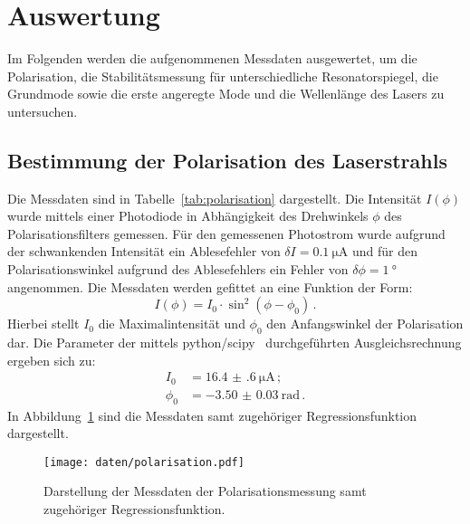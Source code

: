 \section{Auswertung}
\label{sec:Auswertung}
Im Folgenden werden die aufgenommenen Messdaten ausgewertet, um die Polarisation, die Stabilitätsmessung für unterschiedliche Resonatorspiegel, die Grundmode sowie die erste angeregte Mode und die Wellenlänge des Lasers
zu untersuchen.
\subsection{Bestimmung der Polarisation des Laserstrahls}
Die Messdaten sind in Tabelle~\ref{tab:polarisation} dargestellt. Die Intensität $I(\phi)$ wurde mittels einer Photodiode in Abhängigkeit des Drehwinkels $\phi$ des Polarisationsfilters gemessen. Für den gemessenen Photostrom wurde aufgrund der schwankenden Intensität ein Ablesefehler von $\delta I=\SI{0.1}{\micro\ampere}$ und für den Polarisationswinkel aufgrund des Ablesefehlers ein Fehler von $\delta \phi=\SI{1}{\degree}$ angenommen.
Die Messdaten werden gefittet an eine Funktion der Form:
\begin{equation}
    I(\phi)=I_0\cdot \sin^2\left(\phi-\phi_0\right) \,\text{.}
\end{equation}
Hierbei stellt $I_0$ die Maximalintensität und $\phi_0$ den Anfangswinkel der Polarisation dar.
Die Parameter der mittels python/scipy~\cite{scipy} durchgeführten Ausgleichsrechnung ergeben sich zu:
\begin{align}
  I_0&=\SI{16.4(6)}{\micro\ampere}\,\text {;}\\ \phi_0&=\SI{-3.50(3)}{\radian}\,\text{.}
\end{align}
In Abbildung~\ref{fig:polarisation} sind die Messdaten samt zugehöriger Regressionsfunktion dargestellt.
\begin{figure}
  \centering
  \texttt{[image: daten/polarisation.pdf]}
  \caption{Darstellung der Messdaten der Polarisationsmessung samt zugehöriger Regressionsfunktion.}
  \label{fig:polarisation}
\end{figure}

